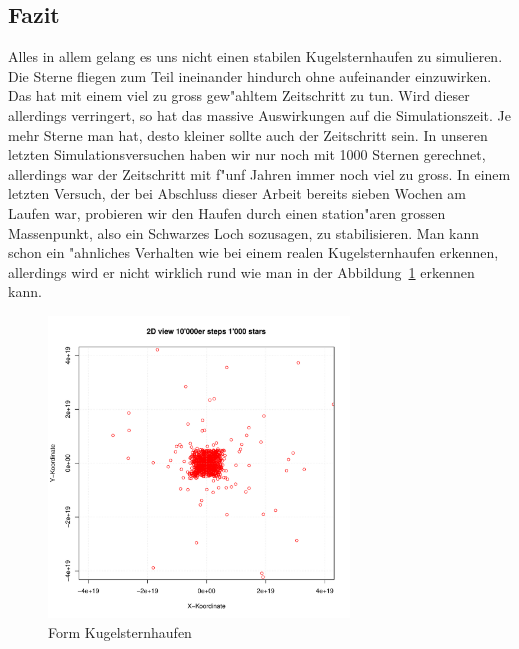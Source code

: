 \begin{refsection}
\section{Fazit}
Alles in allem gelang es uns nicht einen stabilen Kugelsternhaufen
zu simulieren. Die Sterne fliegen zum Teil ineinander hindurch ohne
aufeinander einzuwirken. Das hat mit einem viel zu gross gew"ahltem
Zeitschritt zu tun. Wird dieser allerdings verringert, so hat das
massive Auswirkungen auf die Simulationszeit. Je mehr Sterne man hat,
desto kleiner sollte auch der Zeitschritt sein.
In unseren letzten Simulationsversuchen haben wir nur noch mit 1000
Sternen gerechnet, allerdings war der Zeitschritt mit f"unf Jahren immer
noch viel zu gross.
In einem letzten Versuch, der bei Abschluss dieser Arbeit bereits sieben
Wochen am Laufen war, probieren wir den Haufen durch einen station"aren
grossen Massenpunkt, also ein Schwarzes Loch sozusagen, zu stabilisieren.
Man kann schon ein "ahnliches Verhalten wie bei einem realen
Kugelsternhaufen erkennen, allerdings wird er nicht wirklich rund wie
man in der Abbildung~\ref{Kugel.FormKug} erkennen kann.
\begin{figure}[h!]
\begin{center}
		\includegraphics[width = 8cm]{kugel/images/quadrat.pdf}
\end{center}
\caption{Form Kugelsternhaufen
\label{Kugel.FormKug}}
\end{figure}\\

\printbibliography[heading=subbibliography]
\end{refsection}
